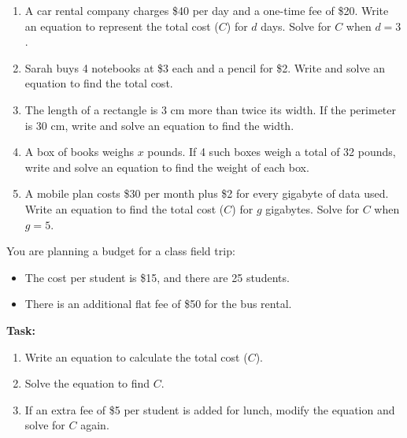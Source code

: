 \documentclass[12pt]{article}
\begin{document}
\begin{tcolorbox}[colframe=black!60, colback=white, 
coltitle=black, colbacktitle=black!15, fonttitle=\bfseries\Large, 
title=Problems, halign title=center, left=10pt, right=10pt, top=10pt, bottom=60pt]
\begin{enumerate}[start=9, itemsep=5em]
    \item A car rental company charges \$40 per day and a one-time fee of \$20. Write an equation to represent the total cost (\(C\)) for \(d\) days. Solve for \(C\) when \(d = 3\).
    \item Sarah buys 4 notebooks at \$3 each and a pencil for \$2. Write and solve an equation to find the total cost.
    \item The length of a rectangle is 3 cm more than twice its width. If the perimeter is 30 cm, write and solve an equation to find the width.
    \item A box of books weighs \(x\) pounds. If 4 such boxes weigh a total of 32 pounds, write and solve an equation to find the weight of each box.
    \item A mobile plan costs \$30 per month plus \$2 for every gigabyte of data used. Write an equation to find the total cost (\(C\)) for \(g\) gigabytes. Solve for \(C\) when \(g = 5\).
\end{enumerate}
\end{tcolorbox}

\vspace{1em}

\begin{tcolorbox}[colframe=black!60, colback=white, 
coltitle=black, colbacktitle=black!15, fonttitle=\bfseries\Large, 
title=Performance Task: Planning a Budget, halign title=center, left=10pt, right=10pt, top=10pt, bottom=50pt]
You are planning a budget for a class field trip:
\begin{itemize}
    \item The cost per student is \$15, and there are 25 students.
    \item There is an additional flat fee of \$50 for the bus rental.
\end{itemize}
\textbf{Task:}
\begin{enumerate}[itemsep=3em]
    \item Write an equation to calculate the total cost (\(C\)).
    \item Solve the equation to find \(C\).
    \item If an extra fee of \$5 per student is added for lunch, modify the equation and solve for \(C\) again.
\end{enumerate}
\end{tcolorbox}
\end{document}
